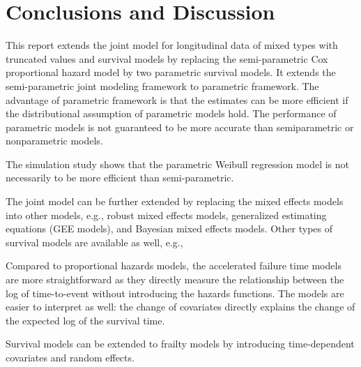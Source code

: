 \section{Conclusions and Discussion}
\label{sec:discuss}

This report extends the joint model for longitudinal data of mixed types with truncated values and survival models by replacing the semi-parametric Cox proportional hazard model by two parametric survival models. It extends the semi-parametric joint modeling framework to parametric framework. The advantage of parametric framework is that the estimates can be more efficient if the distributional assumption of parametric models hold. The performance of parametric models is not guaranteed to be more accurate than semiparametric or nonparametric models. 

The simulation study shows that the parametric Weibull regression model is not necessarily to be more efficient than semi-parametric.

The joint model can be further extended by replacing the mixed effects models into other models, e.g., robust mixed effects models, generalized estimating equations (GEE models), and Bayesian mixed effects models. Other types of survival models are available as well, e.g., 

Compared to proportional hazards models, the accelerated failure time models are more straightforward as they directly measure the relationship between the log of time-to-event without introducing the hazards functions. The models are easier to interpret as well: the change of covariates directly explains the change of the expected log of the survival time. 


Survival models can be extended to frailty models by introducing time-dependent covariates and random effects. %